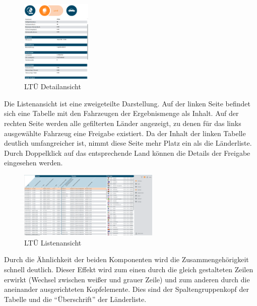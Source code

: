 \begin{figure}[H]
 \centering
 \includegraphics[width=0.3\textwidth]{grafiken/ltue_details.png}
 \caption{LTÜ Detailansicht}
 \label{fig:ltueDetails}
\end{figure}
Die Listenansicht ist eine zweigeteilte Darstellung. Auf der linken Seite befindet sich eine Tabelle mit den Fahrzeugen der Ergebnismenge als Inhalt. Auf der rechten Seite werden alle gefilterten Länder angezeigt, zu denen für das links ausgewählte Fahrzeug eine Freigabe existiert. Da der Inhalt der linken Tabelle deutlich umfangreicher ist, nimmt diese Seite mehr Platz ein als die Länderliste. Durch Doppelklick auf das entsprechende Land können die Details der Freigabe eingesehen werden.\par
\begin{figure}[H]
 \centering
 \includegraphics[width=0.6\textwidth]{grafiken/ltue_list.png}
 \caption{LTÜ Listenansicht}
 \label{fig:ltueList}
\end{figure}
Durch die Ähnlichkeit der beiden Komponenten wird die Zusammengehörigkeit schnell deutlich. Dieser Effekt wird zum einen durch die gleich gestalteten Zeilen erwirkt (Wechsel zwischen weißer und grauer Zeile) und zum anderen durch die aneinander ausgerichteten Kopfelemente. Dies sind der Spaltengruppenkopf der Tabelle und die \enquote{Überschrift} der Länderliste.\par
